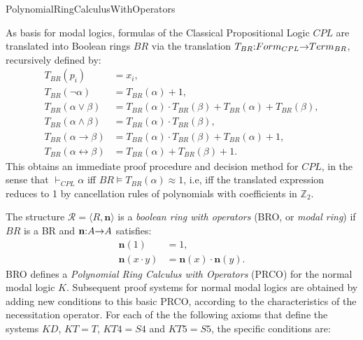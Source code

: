


\maketitle

\begin{entry}{PolynomialRingCalculusWithOperators}  

\newcommand{\fn}[3]{#1\negthickspace : \negthickspace #2 \negthickspace\to\negthickspace #3}
\def\n{\textbf{n}}
\newcommand{\vdashp}{\vdash_{\approx}}

\begin{calculus} 
 
As basis for modal logics, formulas of the Classical Propositional Logic
$CPL$ are translated into Boolean rings $BR$ via  the translation
$\fn{T_{BR}}{Form_{CPL}}{Term_{BR}}$, recursively defined by:
\begin{align*}   
        T_{BR}(p_i) &= x_i,\\
        T_{BR}(\neg \alpha) &= T_{BR}(\alpha) + 1,\\
        T_{BR}(\alpha \vee \beta) &= T_{BR}(\alpha) \cdot T_{BR}(\beta) + T_{BR}(\alpha) + T_{BR}(\beta),\\
        T_{BR}(\alpha \wedge \beta) &= T_{BR}(\alpha) \cdot T_{BR}(\beta),\\
        T_{BR}(\alpha \to \beta) &= T_{BR}(\alpha) \cdot T_{BR}(\beta) + T_{BR}(\alpha) + 1,\\
        T_{BR}(\alpha \leftrightarrow \beta) &= T_{BR}(\alpha) + T_{BR}(\beta) + 1. 
\end{align*}
This obtains an immediate proof procedure and decision method for $CPL$, in the
sense that
$\vdash_{CPL} \alpha$ iff  $BR \vDash T_{BR}(\alpha) \approx 1$,
i.e, iff the translated expression reduces to 1 by cancellation rules of
polynomials with  coefficients in $\mathbb{Z}_{2}$.
 
The  structure   $\mathcal{R}=\langle R,  \n \rangle$ is a \emph{boolean ring
with operators} (BRO, or \emph{modal ring})  if $BR$ is a BR and $\fn{\n}{A}{A}$
satisfies:
%
\begin{align*}
        \n(1) &= 1,\\
        \n(x \cdot y) &= \n(x) \cdot \n(y).
\end{align*}
%
BRO defines a \emph{Polynomial Ring Calculus with Operators} (PRCO) for the
normal modal logic $K$. Subsequent proof systems for normal modal logics
are obtained by adding new conditions to this basic PRCO, according to the
characteristics of the necessitation operator. For each of the  the following
axioms that define the systems $KD$, $KT= T$, $KT4 = S4$ and $KT5= S5$,  the
specific conditions are:


\end{calculus}
\end{entry}
